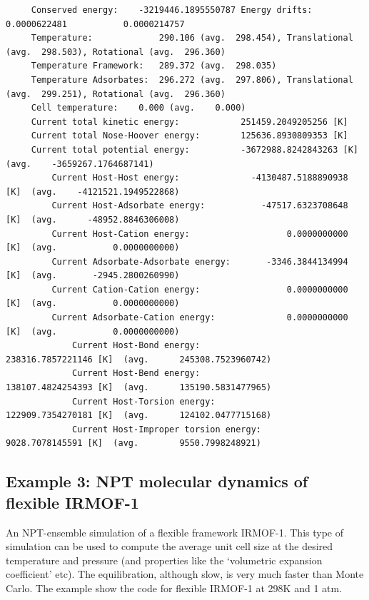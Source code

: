 \begin{tiny}
\begin{verbatim}
     Conserved energy:    -3219446.1895550787 Energy drifts:  0.0000622481           0.0000214757
     Temperature:             290.106 (avg.  298.454), Translational (avg.  298.503), Rotational (avg.  296.360)
     Temperature Framework:   289.372 (avg.  298.035)
     Temperature Adsorbates:  296.272 (avg.  297.806), Translational (avg.  299.251), Rotational (avg.  296.360)
     Cell temperature:    0.000 (avg.    0.000)
     Current total kinetic energy:            251459.2049205256 [K]
     Current total Nose-Hoover energy:        125636.8930809353 [K]
     Current total potential energy:          -3672988.8242843263 [K]  (avg.    -3659267.1764687141)
         Current Host-Host energy:              -4130487.5188890938 [K]  (avg.    -4121521.1949522868)
         Current Host-Adsorbate energy:           -47517.6323708648 [K]  (avg.      -48952.8846306008)
         Current Host-Cation energy:                   0.0000000000 [K]  (avg.           0.0000000000)
         Current Adsorbate-Adsorbate energy:       -3346.3844134994 [K]  (avg.       -2945.2800260990)
         Current Cation-Cation energy:                 0.0000000000 [K]  (avg.           0.0000000000)
         Current Adsorbate-Cation energy:              0.0000000000 [K]  (avg.           0.0000000000)
             Current Host-Bond energy:                  238316.7857221146 [K]  (avg.      245308.7523960742)
             Current Host-Bend energy:                  138107.4824254393 [K]  (avg.      135190.5831477965)
             Current Host-Torsion energy:               122909.7354270181 [K]  (avg.      124102.0477715168)
             Current Host-Improper torsion energy:        9028.7078145591 [K]  (avg.        9550.7998248921)
\end{verbatim}
\end{tiny}

\subsection*{Example 3: NPT molecular dynamics of flexible IRMOF-1}

An NPT-ensemble simulation of a flexible framework IRMOF-1. This type of simulation can be used to compute the average
unit cell size at the desired temperature and pressure (and properties like the `volumetric expansion coefficient' etc).
The equilibration, although slow, is very much faster than Monte Carlo. The example show the code for flexible
IRMOF-1 at 298K and 1 atm.

